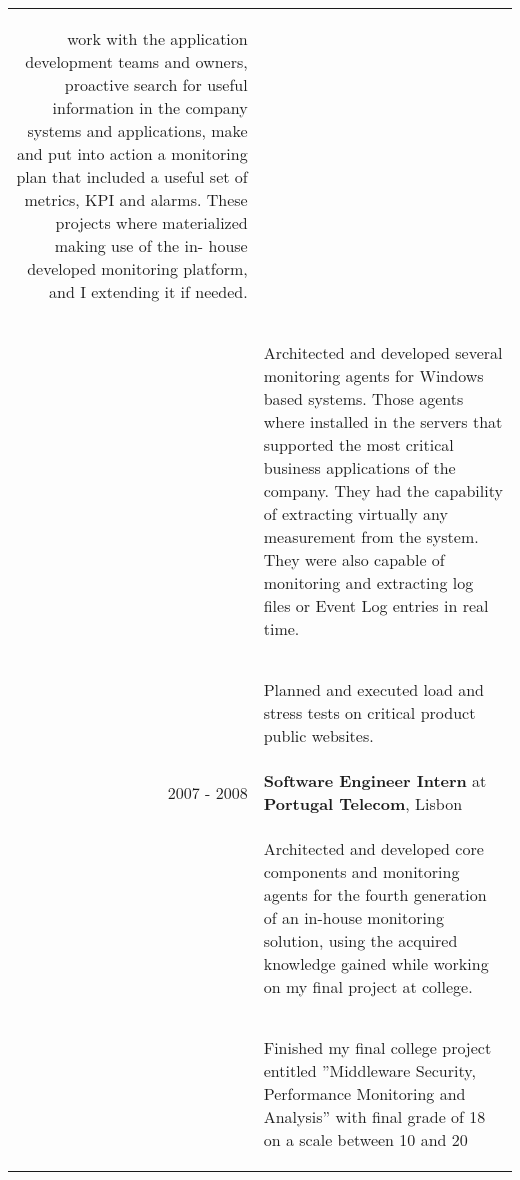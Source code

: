 \documentclass[a4paper,10pt]{article}
\begin{document}
\begin{tabular}{rp{11cm}}
\begin{compactitem}
work with the application development teams and owners, proactive search
for useful information in the company systems and applications, make and
put into action a monitoring plan that included a useful set of metrics, KPI
and alarms. These projects where materialized making use of the in- house
developed monitoring platform, and I extending it if needed.
     \end{compactitem}\vspace{-1em} \\
  & \begin{compactitem} 
     \item
     Architected and developed several monitoring agents for Windows based
systems. Those agents where installed in the servers that supported the
most critical business applications of the company. They had the capability
of extracting virtually any measurement from the system. They were also
capable of monitoring and extracting log files or Event Log entries in real
time.
     \end{compactitem}\vspace{-1em} \\
  & \begin{compactitem} 
     \item Planned and executed load and stress tests on critical product public websites.
     \end{compactitem}\vspace{-1em} \\
  \textsc{2007 - 2008} & \textbf{Software Engineer Intern} at \textbf{Portugal Telecom}, Lisbon\\ 
   & \begin{compactitem}
   \item
   Architected and developed core components and monitoring agents for the
fourth generation of an in-house monitoring solution, using the acquired
knowledge gained while working on my final project at college.
   \end{compactitem}\vspace{-1em} \\
  & \begin{compactitem}
   \item
   Finished my final college project entitled ”Middleware Security, Performance
Monitoring and Analysis” with final grade of 18 on a scale between 10 and
20
   \end{compactitem}\vspace{-1em} \\

\end{tabular}
\end{document}
